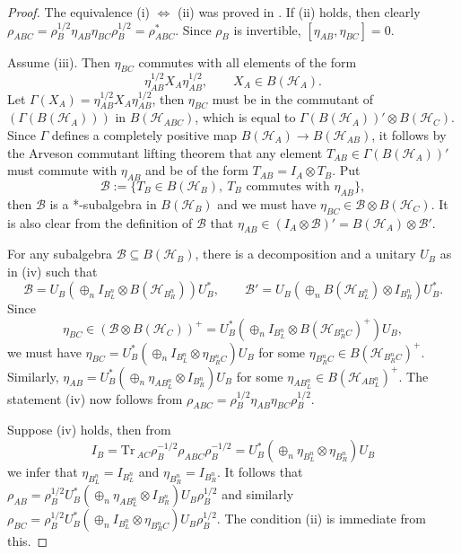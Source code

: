 \documentclass[12pt]{article}
\theoremstyle{definition}
\theoremstyle{remark}
\def\Be{\mathcal B}
\def\Ha{\mathcal H}
\def \Tr{\mathrm{Tr}\,}
\begin{document}
\begin{proof} The equivalence (i) $\iff$ (ii) was proved in \cite{}. If (ii) holds, then 
clearly $\rho_{ABC}=\rho_B^{1/2}\eta_{AB}\eta_{BC}\rho_B^{1/2}=\rho_{ABC}^*$.
Since $\rho_B$ is invertible, 
$[\eta_{AB},\eta_{BC}]=0$. 

Assume (iii). Then $\eta_{BC}$ commutes with all
elements of the form 
\[
\eta_{AB}^{1/2}X_A\eta_{AB}^{1/2}, \qquad X_A\in B(\Ha_A).
\]
Let $\Gamma(X_{A})=\eta_{AB}^{1/2}X_A\eta_{AB}^{1/2}$, then $\eta_{BC}$ must be in the
commutant of $(\Gamma(B(\Ha_A)))$ in $B(\Ha_{ABC})$, which is equal to
$\Gamma(B(\Ha_A))'\otimes B(\Ha_C)$. Since $\Gamma$ defines a completely positive map
$B(\Ha_A)\to B(\Ha_{AB})$, it follows by the Arveson commutant lifting theorem
\cite[1.3.1]{arveson1969subalgebras} that any element  $T_{AB}\in \Gamma(B(\Ha_A))'$ must
commute with $\eta_{AB}$ and be of the form $T_{AB}=I_A\otimes T_B$. Put
\begin{equation}\label{eq:decomp}
\Be:=\{T_B\in B(\Ha_B),\ T_B \text{ commutes with } \eta_{AB}\},
\end{equation}
then $\Be$ is a *-subalgebra in $B(\Ha_B)$ and we must have $\eta_{BC}\in \Be\otimes
B(\Ha_C)$. It is also clear from the definition of $\Be$ that $\eta_{AB}\in (I_A\otimes
\Be)'=B(\Ha_A)\otimes \Be'$. 

For any subalgebra $\Be\subseteq B(\Ha_B)$, there is a decomposition and a unitary $U_B$
as in (iv) such that
\[
\Be=U_B\left(\oplus_n I_{B_L^n}\otimes B(\Ha_{B_R^n})\right)U_B^*,\qquad \Be'=U_B\left(\oplus_n
B(\Ha_{B_L^n})\otimes I_{B_R^n}\right)U_B^*.
\]
Since 
\[
\eta_{BC}\in (\Be\otimes B(\Ha_C))^+=U_B^*\left(\oplus_n I_{B_L^n}\otimes
B(\Ha_{B_R^nC})^+\right)U_B,
\]
we must have $\eta_{BC}=U_B^*\left(\oplus_n I_{B_L^n}\otimes\eta_{B_R^nC}\right)U_B$ for
some $\eta_{B_R^nC}\in B(\Ha_{B_R^nC})^+$. Similarly, $\eta_{AB}=U_B^*\left(\oplus_n
\eta_{AB_L^n}\otimes I_{B_R^n}\right)U_B$ for some $\eta_{AB_L^n}\in B(\Ha_{AB_L^n})^+$. 
The statement (iv) now follows from $\rho_{ABC}=\rho_B^{1/2}\eta_{AB}\eta_{BC}\rho_B^{1/2}$.


Suppose (iv) holds, then from
\[
I_B=\Tr_{AC}\rho_B^{-1/2}\rho_{ABC}\rho_B^{-1/2}=U_B^*\left(\oplus_n \eta_{B_L^n}\otimes
\eta_{B_R^n}\right)U_B
\]
we infer that $\eta_{B_L^n}=I_{B_L^n}$ and $\eta_{B_R^n}=I_{B_R^n}$. It follows that
$\rho_{AB}=\rho_B^{1/2}U^*_B\left(\oplus_n \eta_{AB_L^n}\otimes
I_{B_R^n}\right)U_B\rho_B^{1/2}$ and
similarly $\rho_{BC}=\rho_B^{1/2}U^*_B\left(\oplus_n I_{B_L^n}\otimes
\eta_{B_R^nC}\right)U_B\rho_B^{1/2}$. The condition (ii) is immediate from this.



\end{proof}
\end{document}
